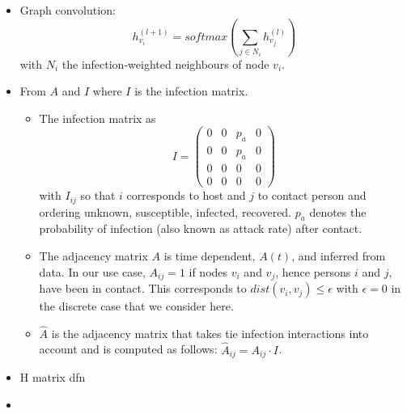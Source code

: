 \documentclass[]{article}
\begin{document}
\begin{itemize}
	\item Graph convolution:
	\begin{equation}
		h_{v_i}^{(l+1)} = softmax(\sum_{j\in N_i} h_{v_j}^{(l)})
	\end{equation}
	with $N_i$ the infection-weighted neighbours of node $v_i$.
	\item From $A$ and $I$ where $I$ is the infection matrix.
	\begin{itemize}
		\item The infection matrix as
		\begin{equation}
			I =
			\begin{pmatrix}
				0 & 0 & p_a & 0 \\
				0 & 0 & p_a & 0 \\
				0 & 0 &  0  & 0 \\
				0 & 0 &  0  & 0
			\end{pmatrix}
		\end{equation}
		with $I_{ij}$ so that $i$ corresponds to host and $j$ to contact person and ordering unknown, susceptible, infected, recovered. $p_a$ denotes the probability of infection (also known as attack rate) after contact.
		\item The adjacency matrix $A$ is time dependent, $A(t)$, and inferred from data. In our use case, $A_{ij}=1$ if nodes $v_i$ and $v_j$, hence persons $i$ and $j$, have been in contact. This corresponds to $dist(v_i, v_j) \le \epsilon$ with $\epsilon=0$ in the discrete case that we consider here.
		\item $\hat{A}$ is the adjacency matrix that takes tie infection interactions into account and is computed as follows: $\hat{A}_{ij} = A_{ij}\cdot I_{}$.
	\end{itemize}
	\item H matrix dfn
	\item 
\end{itemize}
\end{document}
